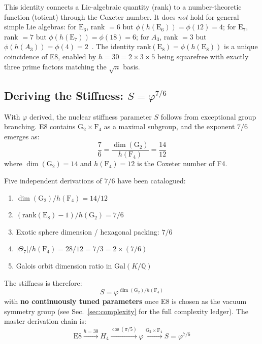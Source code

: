 \documentclass[aps,prd,twocolumn,superscriptaddress,floatfix,nofootinbib]{revtex4-2}
\theoremstyle{definition}
\theoremstyle{remark}
\newcommand{\vp}{\varphi}
\begin{document}
This identity connects a Lie-algebraic quantity (rank) to a number-theoretic
function (totient) through the Coxeter number. It does \emph{not} hold for general
simple Lie algebras: for $\mathrm{E}_6$, rank $= 6$ but $\phi(h(\mathrm{E}_6)) = \phi(12) = 4$;
for $\mathrm{E}_7$, rank $= 7$ but $\phi(h(\mathrm{E}_7)) = \phi(18) = 6$;
for $A_3$, rank $= 3$ but $\phi(h(A_3)) = \phi(4) = 2$~\cite{kostant}. The identity
$\text{rank}(\text{E}_8) = \phi(h(\text{E}_8))$ is a unique coincidence of E8,
enabled by $h = 30 = 2 \times 3 \times 5$ being squarefree with exactly three
prime factors matching the $\sqrt{n}$ basis.

\subsection{Deriving the Stiffness: $S = \vp^{7/6}$}
\label{sec:stiffness-derived}

With $\vp$ derived, the nuclear stiffness parameter $S$ follows from exceptional
group branching. E8 contains $\text{G}_2 \times \text{F}_4$ as a maximal subgroup,
and the exponent $7/6$ emerges as:
\begin{equation}
    \frac{7}{6} = \frac{\dim(\text{G}_2)}{h(\text{F}_4)} = \frac{14}{12}
\end{equation}
where $\dim(\text{G}_2) = 14$ and $h(\text{F}_4) = 12$ is the Coxeter number of F4.

Five independent derivations of $7/6$ have been catalogued:
\begin{enumerate}
    \item $\dim(\text{G}_2)/h(\text{F}_4) = 14/12$ 
    \item $(\text{rank}(\text{E}_8) - 1)/h(\text{G}_2) = 7/6$ 
    \item Exotic sphere dimension / hexagonal packing: $7/6$ 
    \item $|\Theta_7|/h(\text{F}_4) = 28/12 = 7/3 = 2 \times (7/6)$ \quad [PILLAR]
    \item Galois orbit dimension ratio in $\text{Gal}(K/\mathbb{Q})$ \quad [SAND]
\end{enumerate}

\noindent
The stiffness is therefore:
\begin{equation}
    \boxed{S = \vp^{\dim(\text{G}_2)/h(\text{F}_4)}}
\end{equation}
with \textbf{no continuously tuned parameters} once E8 is chosen as the vacuum symmetry group (see Sec.~\ref{sec:complexity} for the full complexity ledger).
The master derivation chain is:
\begin{equation}
    \text{E8} \xrightarrow{h=30} H_4 \xrightarrow{\cos(\pi/5)} \vp
    \xrightarrow{\text{G}_2 \times \text{F}_4} S = \vp^{7/6}
\end{equation}
\end{document}
